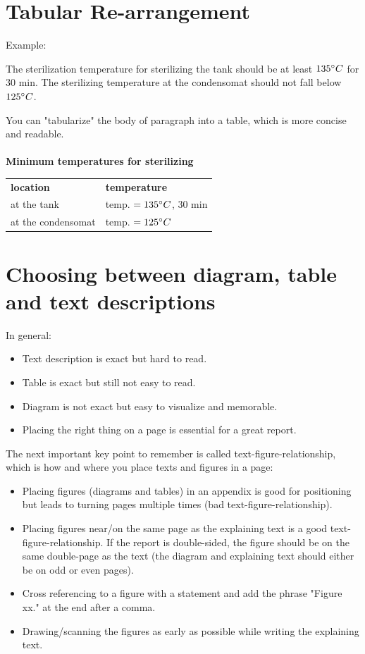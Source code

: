\section{Tabular Re-arrangement}
Example:

The sterilization temperature for sterilizing the tank should be at least $ 135^\circ C $ for $ 30 $ min. The sterilizing temperature at the condensomat should not fall below $ 125^\circ C $.

You can "tabularize" the body of paragraph into a table, which is more concise and readable.\\\\
\textbf{Minimum temperatures for sterilizing}
\begin{table}[ht]
	\begin{tabular}{p{}p{}}
		\textbf{location} & \textbf{temperature}\\
		at the tank & temp. $ =135^\circ C $, 30 min\\
		at the condensomat & temp. $ =125^\circ C $
	\end{tabular}
\end{table}

\section{Choosing between diagram, table and text descriptions}
In general:
\begin{itemize}
	\item Text description is exact but hard to read.
	\item Table is exact but still not easy to read.
	\item Diagram is not exact but easy to visualize and memorable.
	\item Placing the right thing on a page is essential for a great report.
\end{itemize}
The next important key point to remember is called text-figure-relationship, which is how and where you place texts and figures in a page:
\begin{itemize}
	\item Placing figures (diagrams and tables) in an appendix is good for positioning but leads to turning pages multiple times (bad text-figure-relationship).
	\item Placing figures near/on the same page as the explaining text is a good text-figure-relationship. If the report is double-sided, the figure should be on the same double-page as the text (the diagram and explaining text should either be on odd or even pages).
	\item Cross referencing to a figure with a statement and add the phrase "Figure xx." at the end after a comma.
	\item Drawing/scanning the figures as early as possible while writing the explaining text.
\end{itemize}

